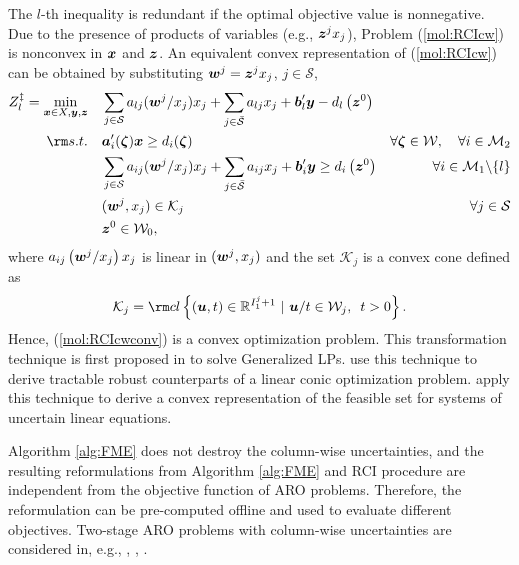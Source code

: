 \documentclass[fleqn,mnsc,blindrev]{informs4}
\newcommand{\mb}[1]{\mbox{\boldmath \ensuremath{#1}}}
\begin{document}
		The  $l$-th inequality is redundant if the optimal objective value is nonnegative. Due to the presence of products of variables (e.g., $\mb{z}^j x_j$), Problem (\ref{mol:RCIcw}) is nonconvex in $\mb{x}$ and $\mb{z}$. An equivalent convex representation of (\ref{mol:RCIcw}) can be obtained by substituting $\mb{w}^j= \mb{z}^j x_j$, $j \in \mathcal{S}$,
\begin{equation} \label{mol:RCIcwconv}
			\begin{aligned} 
				Z^\ddag_l =	\min_{ \boldsymbol{x} \in X , \boldsymbol{y}, \boldsymbol{z}} \quad &  \sum_{j\in \mathcal{S}} a_{lj}(\mb{w}^j/x_j)  x_j + \sum_{j\in \bar{\mathcal{S} }} a_{lj} x_j  + \mb{b}'_l \mb{y} - d_l\left(\mb{z}^0\right)  \\
				{\rm s.t.}  \quad &  \mb{a}'_i(\mb{\zeta})\mb{x} \geq d_i(\mb{\zeta}) &  \forall  \mb{\zeta} \in  \mathcal{W}, \quad \forall i  \in \mathcal{M}_2  \\
				\quad &  \sum_{j\in \mathcal{S}} a_{ij}(\mb{w}^j/x_j) x_j + \sum_{j\in \bar{\mathcal{S} }} a_{ij} x_j  +\mb{b}'_i \mb{y} \geq d_i\left(\mb{z}^0\right) &  \forall i  \in \mathcal{M}_1 \backslash \{l\} \\
				\quad & (\mb{w}^j,x_j) \in \mathcal{K}_j & \forall   j \in \mathcal{S}\\
				\quad & \mb{z}^0 \in \mathcal{W}_0,
			\end{aligned}
\end{equation}
		where $a_{ij}\left(\mb{w}^j/x_j\right)x_j$ is linear in  $(\mb{w}^j,x_j)$ and the set $\mathcal{K}_j $ is a convex cone defined as 
\begin{equation*}
		\mathcal{K}_j  = {\rm cl}\left\{ (\mb{u},t) \in \mathbb{R}^{I^j_1+1}~|~ \mb{u}/t \in \mathcal{W}_j, \enskip t>0\right\}. 
\end{equation*}
		Hence, (\ref{mol:RCIcwconv}) is a convex optimization problem. This transformation technique is first proposed in \cite{d63} to solve Generalized LPs. \cite{gbbd14} use this technique to derive tractable robust counterparts of a linear conic optimization problem. \cite{zd17} apply this technique to derive a convex representation of the feasible set for systems of uncertain linear equations.
		
		Algorithm \ref{alg:FME} does not destroy the column-wise uncertainties,  {and the resulting reformulations from Algorithm \ref{alg:FME} and RCI procedure are independent from the objective function of ARO problems. Therefore, the reformulation can be pre-computed offline and used to evaluate different objectives.} Two-stage ARO problems with column-wise uncertainties are considered in, e.g.,  \cite{m11}, \cite{ad16a}, \cite{xb16}. 
		
\end{document}
